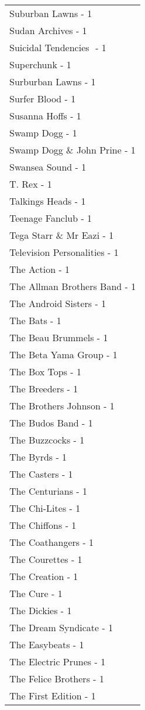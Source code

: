 \documentclass[
]{article}
\begin{document}
\begin{longtable}{l}
Suburban Lawns - 1 \\ 
Sudan Archives - 1 \\ 
Suicidal Tendencies ‎ - 1 \\ 
Superchunk - 1 \\ 
Surburban Lawns - 1 \\ 
Surfer Blood - 1 \\ 
Susanna Hoffs - 1 \\ 
Swamp Dogg - 1 \\ 
Swamp Dogg \& John Prine - 1 \\ 
Swansea Sound - 1 \\ 
T. Rex - 1 \\ 
Talkings Heads - 1 \\ 
Teenage Fanclub - 1 \\ 
Tega Starr \& Mr Eazi - 1 \\ 
Television Personalities - 1 \\ 
The Action - 1 \\ 
The Allman Brothers Band - 1 \\ 
The Android Sisters - 1 \\ 
The Bats - 1 \\ 
The Beau Brummels - 1 \\ 
The Beta Yama Group - 1 \\ 
The Box Tops - 1 \\ 
The Breeders - 1 \\ 
The Brothers Johnson - 1 \\ 
The Budos Band - 1 \\ 
The Buzzcocks - 1 \\ 
The Byrds - 1 \\ 
The Casters - 1 \\ 
The Centurians - 1 \\ 
The Chi-Lites - 1 \\ 
The Chiffons - 1 \\ 
The Coathangers - 1 \\ 
The Courettes - 1 \\ 
The Creation - 1 \\ 
The Cure - 1 \\ 
The Dickies - 1 \\ 
The Dream Syndicate - 1 \\ 
The Easybeats - 1 \\ 
The Electric Prunes - 1 \\ 
The Felice Brothers - 1 \\ 
The First Edition - 1 \\ 

\end{longtable}
\end{document}
